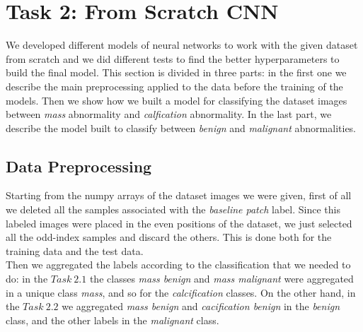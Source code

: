 \documentclass[11pt,a4paper,oneside]{article}
\begin{document}
\clearpage

\section{Task 2: From Scratch CNN}
We developed different models of neural networks to work with the given dataset from scratch and we did different tests to find the better hyperparameters to build the final model. This section is divided in three parts: in the first one we describe the main preprocessing applied to the data before the training of the models. Then we show how we built a model for classifying the dataset images between \textit{mass} abnormality and \textit{calfication} abnormality. In the last part, we describe the model built to classify between \textit{benign} and \textit{malignant} abnormalities.

\subsection{Data Preprocessing}
Starting from the numpy arrays of the dataset images we were given, first of all we deleted all the samples associated with the \textit{baseline patch} label. Since this labeled images were placed in the even positions of the dataset, we just selected all the odd-index samples and discard the others. This is done both for the training data and the test data. \\
Then we aggregated the labels according to the classification that we needed to do: in the $Task\ 2.1$ the classes \textit{mass benign} and  \textit{mass malignant} were aggregated in a unique class \textit{mass}, and so for the \textit{calcification} classes. On the other hand, in the $Task\ 2.2$ we aggregated  \textit{mass benign} and  \textit{cacification benign} in the \textit{benign} class, and the other labels in the \textit{malignant} class.
\end{document}
